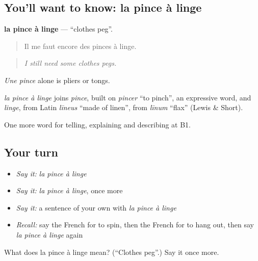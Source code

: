 \subsection*{You'll want to know: la pince à linge}
\textbf{la pince à linge} — \textquotedblleft{}clothes peg\textquotedblright{}.

\begin{quote}
Il me faut encore des pinces à linge.
\end{quote}

\begin{quote}
\emph{I still need some clothes pegs.}
\end{quote}

\emph{Une pince} alone is pliers or tongs.

\begin{cousinweb}
\emph{la pince à linge} joins \emph{pince}, built on \emph{pincer} \textquotedblleft{}to pinch\textquotedblright{}, an expressive word, and \emph{linge}, from Latin \emph{līneus} \textquotedblleft{}made of linen\textquotedblright{}, from \emph{līnum} \textquotedblleft{}flax\textquotedblright{} (Lewis \& Short).
\end{cousinweb}

\begin{grammarlens}[title={What you've built}]
One more word for telling, explaining and describing at B1.
\end{grammarlens}

\subsection*{Your turn}
\begin{itemize}
\raggedright
  \item \emph{Say it:} \emph{la pince à linge}
  \item \emph{Say it:} \emph{la pince à linge}, once more
  \item \emph{Say it:} a sentence of your own with \emph{la pince à linge}
  \item \emph{Recall:} say the French for to spin, then the French for to hang out, then say \emph{la pince à linge} again
\end{itemize}

\begin{tcolorbox}[breakable,colback=teal!4,colframe=teal!35!black,title={Before you move on}]
What does la pince à linge mean? (\textquotedblleft{}Clothes peg\textquotedblright{}.) Say it once more.
\end{tcolorbox}
